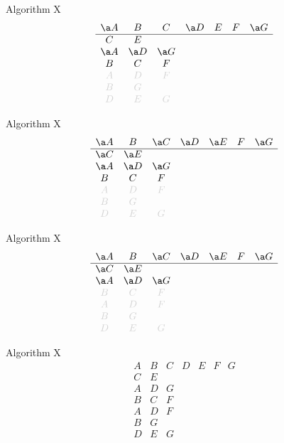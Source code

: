 \documentclass[xcolor=svgnames]{beamer}
\begin{document}
\def\lg{\color{LightGray}}
%
\begin{frame}{Algorithm X}
\Large\boldmath
  $$
  \begin{array}{ccccccc}
    \a A & B & C & \a D & E & F & \a G\\
    \hline
    C & E &&&&&\\
    \a A & \a D & \a G &&&&\\
    B & C & F &&&&\\
    \lg A & \lg D & \lg F &&&&\\
    \lg B & \lg G &&&&&\\
    \lg D & \lg E & \lg G &&&&
  \end{array}
  $$
\end{frame}

%
\begin{frame}{Algorithm X}
\Large\boldmath
  $$
  \begin{array}{ccccccc}
    \a A & B & \a C & \a D & \a E & F & \a G\\
    \hline
    \a C & \a E &&&&&\\
    \a A & \a D & \a G &&&&\\
    B & C & F &&&&\\
    \lg A & \lg D & \lg F &&&&\\
    \lg B & \lg G &&&&&\\
    \lg D & \lg E & \lg G &&&&
  \end{array}
  $$
\end{frame}

%
\begin{frame}{Algorithm X}
  \Large\boldmath
  $$
  \begin{array}{ccccccc}
    \a A & B & \a C & \a D & \a E & F & \a G\\
    \hline
    \a C & \a E &&&&&\\
    \a A & \a D & \a G &&&&\\
    \lg B & \lg C & \lg F &&&&\\
    \lg A & \lg D & \lg F &&&&\\
    \lg B & \lg G &&&&&\\
    \lg D & \lg E & \lg G &&&&
  \end{array}
  $$
\end{frame}

%
\begin{frame}{Algorithm X}
\Large\boldmath
  $$
  \begin{array}{ccccccc}
    A & B & C & D & E & F & G\\
    \hline
    C & E &&&&&\\
    A & D & G &&&&\\
    B & C & F &&&&\\
    A & D & F &&&&\\
    B & G &&&&&\\
    D & E & G &&&&
  \end{array}
  $$
\end{frame}
\end{document}
